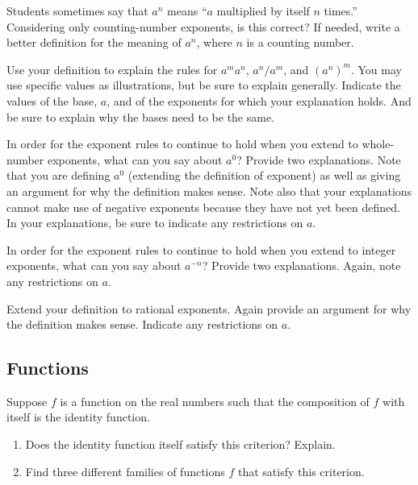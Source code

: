 \documentclass[space,nooutcomes]{ximera}
\begin{document}
\begin{problem}
Students sometimes say that $a^n$ means ``$a$ multiplied by itself $n$ times.''  Considering only counting-number exponents, is this correct?  If needed, write a better definition for the meaning of $a^n$, where $n$ is a counting number.
\end{problem}

\begin{problem}
Use your definition to explain the rules for $a^ma^n$, $a^n/a^m$, and $(a^n)^m$.  You may use specific values as illustrations, but be sure to explain generally.  Indicate the values of the base, $a$, and of the exponents for which your explanation holds.  And be sure to explain why the bases need to be the same.  
\end{problem}

\begin{problem}
In order for the exponent rules to continue to hold when you extend to whole-number exponents, what can you say about $a^0$?  Provide two explanations.  Note that you are defining $a^0$ (extending the definition of exponent) as well as giving an argument for why the definition makes sense.  Note also that your explanations cannot make use of negative exponents because they have not yet been defined.  In your explanations, be sure to indicate any restrictions on $a$.  
\end{problem}

\begin{problem}
In order for the exponent rules to continue to hold when you extend to integer exponents, what can you say about $a^{-n}$?  Provide two explanations.  Again, note any restrictions on $a$.
\end{problem}

\begin{problem}
Extend your definition to rational exponents.  Again provide an argument for why the definition makes sense.  Indicate any restrictions on $a$.
\end{problem}

\subsection*{Functions}

\begin{problem}
Suppose $f$ is a function on the real numbers such that the composition of $f$ with itself is the identity function.  
\begin{enumerate}
\item Does the identity function itself satisfy this criterion?  Explain.  
\item Find three different families of functions $f$ that satisfy this criterion.  
\end{enumerate}
\end{problem}
\end{document}
